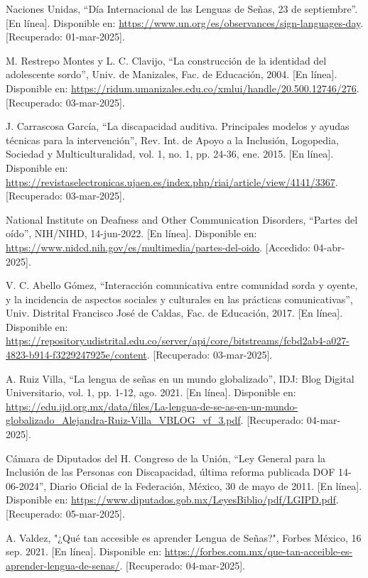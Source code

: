 \begin{thebibliography}{99}
    Naciones Unidas, “Día Internacional de las Lenguas de Señas, 23 de septiembre”. [En línea]. Disponible en: \url{https://www.un.org/es/observances/sign-languages-day}. [Recuperado: 01-mar-2025].

    M. Restrepo Montes y L. C. Clavijo, “La construcción de la identidad del adolescente sordo”, Univ. de Manizales, Fac. de Educación, 2004. [En línea]. Disponible en: \url{https://ridum.umanizales.edu.co/xmlui/handle/20.500.12746/276}. [Recuperado: 03-mar-2025].

    J. Carrascosa García, “La discapacidad auditiva. Principales modelos y ayudas técnicas para la intervención”, Rev. Int. de Apoyo a la Inclusión, Logopedia, Sociedad y Multiculturalidad, vol. 1, no. 1, pp. 24-36, ene. 2015. [En línea]. Disponible en: \url{https://revistaselectronicas.ujaen.es/index.php/riai/article/view/4141/3367}. [Recuperado: 03-mar-2025].

    National Institute on Deafness and Other Communication Disorders, “Partes del oído”, NIH/NIHD, 14-jun-2022. [En línea]. Disponible en: \url{https://www.nidcd.nih.gov/es/multimedia/partes-del-oido}. [Accedido: 04-abr-2025]. 

    V. C. Abello Gómez, “Interacción comunicativa entre comunidad sorda y oyente, y la incidencia de aspectos sociales y culturales en las prácticas comunicativas”, Univ. Distrital Francisco José de Caldas, Fac. de Educación, 2017. [En línea]. Disponible en: \url{https://repository.udistrital.edu.co/server/api/core/bitstreams/fcbd2ab4-a027-4823-b914-f3229247925e/content}. [Recuperado: 03-mar-2025].

    A. Ruiz Villa, “La lengua de señas en un mundo globalizado”, IDJ: Blog Digital Universitario, vol. 1, pp. 1-12, ago. 2021. [En línea]. Disponible en: \url{https://edu.ijd.org.mx/data/files/La-lengua-de-se-as-en-un-mundo-globalizado_Alejandra-Ruiz-Villa_VBLOG_vf_3.pdf}. [Recuperado: 04-mar-2025].

    Cámara de Diputados del H. Congreso de la Unión, “Ley General para la Inclusión de las Personas con Discapacidad, última reforma publicada DOF 14-06-2024”, Diario Oficial de la Federación, México, 30 de mayo de 2011. [En línea]. Disponible en: \url{https://www.diputados.gob.mx/LeyesBiblio/pdf/LGIPD.pdf}. [Recuperado: 05-mar-2025].

    A. Valdez, "¿Qué tan accesible es aprender Lengua de Señas?", Forbes México, 16 sep. 2021. [En línea]. Disponible en: \url{https://forbes.com.mx/que-tan-acceible-es-aprender-lengua-de-senas/}. [Recuperado: 04-mar-2025].


\end{thebibliography}
